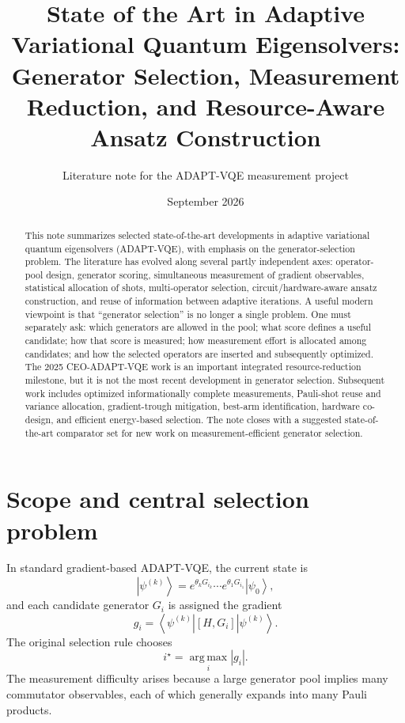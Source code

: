 \documentclass[11pt]{article}
\title{State of the Art in Adaptive Variational Quantum Eigensolvers:\\Generator Selection, Measurement Reduction, and Resource-Aware Ansatz Construction}
\author{Literature note for the ADAPT-VQE measurement project}
\date{September 2026}
\newcommand{\ket}[1]{\left|#1\right\rangle}
\newcommand{\bra}[1]{\left\langle #1\right|}
\newcommand{\comm}[2]{\left[#1,#2\right]}
\newcommand{\argmax}{\operatorname*{arg\,max}}
\begin{document}
\maketitle

\begin{abstract}
This note summarizes selected state-of-the-art developments in adaptive variational quantum eigensolvers (ADAPT-VQE), with emphasis on the generator-selection problem. The literature has evolved along several partly independent axes: operator-pool design, generator scoring, simultaneous measurement of gradient observables, statistical allocation of shots, multi-operator selection, circuit/hardware-aware ansatz construction, and reuse of information between adaptive iterations. A useful modern viewpoint is that ``generator selection'' is no longer a single problem. One must separately ask: which generators are allowed in the pool; what score defines a useful candidate; how that score is measured; how measurement effort is allocated among candidates; and how the selected operators are inserted and subsequently optimized. The 2025 CEO-ADAPT-VQE work is an important integrated resource-reduction milestone, but it is not the most recent development in generator selection. Subsequent work includes optimized informationally complete measurements, Pauli-shot reuse and variance allocation, gradient-trough mitigation, best-arm identification, hardware co-design, and efficient energy-based selection. The note closes with a suggested state-of-the-art comparator set for new work on measurement-efficient generator selection.
\end{abstract}

\section{Scope and central selection problem}

In standard gradient-based ADAPT-VQE, the current state is
\begin{equation}
    \ket{\psi^{(k)}}
    =e^{\theta_k G_{i_k}}\cdots e^{\theta_1G_{i_1}}\ket{\psi_0},
\end{equation}
and each candidate generator $G_i$ is assigned the gradient
\begin{equation}
    g_i
    =\bra{\psi^{(k)}}\comm{H}{G_i}\ket{\psi^{(k)}}.
\end{equation}
The original selection rule chooses
\begin{equation}
    i^\star=\argmax_i |g_i|.
\end{equation}
The measurement difficulty arises because a large generator pool implies many commutator observables, each of which generally expands into many Pauli products.
\end{document}
